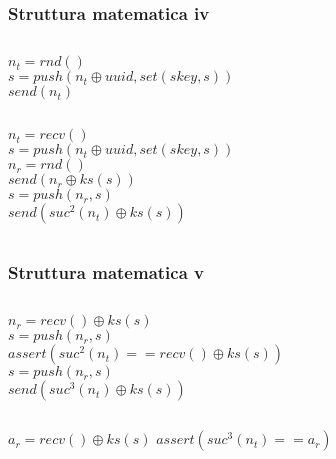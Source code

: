 \begin{frame}
    \frametitle{Struttura matematica iv}
    \begin{columns}
    \end{columns}
    \begin{columns}
            \(n_t = rnd()\)\\ \pause
            \(s = push(n_t \oplus uuid, set(skey, s))\)\\ \pause
            \(send(n_t)\)\pause
    \end{columns}
    \begin{columns}
            \(n_t = recv()\)\\\pause
           \(s = push(n_t \oplus uuid, set(skey, s))\)\\\pause
            \(n_r = rnd()\)\\\pause
            \(send(n_r \oplus ks(s))\)\\\pause
            \(s = push(n_r, s)\)\\\pause
            \(send(suc^2(n_t) \oplus ks(s))\)
    \end{columns}
\end{frame}

\begin{frame}
    \frametitle{Struttura matematica v}
    \begin{columns}
            \(n_r = recv() \oplus ks(s)\)\\\pause
            \(s = push(n_r, s)\)\\\pause
            \(assert(suc^2(n_t) == recv() \oplus ks(s))\)\\\pause
            \(s = push(n_r, s)\)\\\pause
            \(send(suc^3(n_t) \oplus ks(s))\)\pause
   \end{columns}
    \begin{columns}
            \(a_r = recv() \oplus ks(s)\) \pause
            \(assert(suc^3(n_t) == a_r)\)
    \end{columns}
\end{frame}


